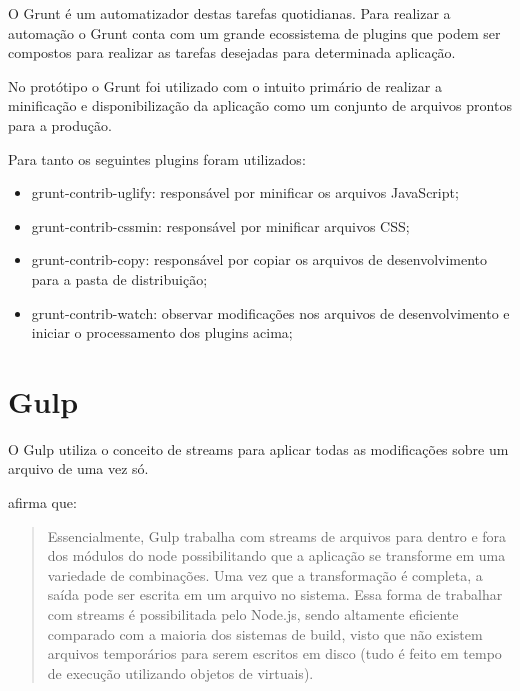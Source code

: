 O Grunt é um automatizador destas tarefas quotidianas. Para realizar
a automação o Grunt conta com um grande ecossistema de plugins que
podem ser compostos para realizar as tarefas desejadas para determinada
aplicação.

No protótipo o Grunt foi utilizado com o intuito primário de realizar
a minificação e disponibilização da aplicação como um conjunto de
arquivos prontos para a produção.

Para tanto os seguintes plugins foram utilizados:

\begin{itemize}
    \item grunt-contrib-uglify: responsável por minificar os arquivos JavaScript;
    \item grunt-contrib-cssmin: responsável por minificar arquivos CSS;
    \item grunt-contrib-copy: responsável por copiar os arquivos de desenvolvimento para a pasta de distribuição;
    \item grunt-contrib-watch: observar modificações nos arquivos de desenvolvimento e iniciar o processamento dos plugins acima;
\end{itemize}

\section{Gulp}

O Gulp utiliza o conceito de streams para aplicar todas as modificações sobre
um arquivo de uma vez só.

\citet{crossPlatformMobileGame} afirma que:
\begin{quote}
Essencialmente, Gulp trabalha com streams de arquivos para dentro e fora
dos módulos do node possibilitando que a aplicação se transforme
em uma variedade de combinações. Uma vez que a transformação é
completa, a saída pode ser escrita em um arquivo no sistema. Essa forma
de trabalhar com streams é possibilitada pelo Node.js, sendo altamente
eficiente comparado com a maioria dos sistemas de build, visto que não
existem arquivos temporários para serem escritos em disco (tudo é
feito em tempo de execução utilizando objetos de virtuais).
\end{quote}

